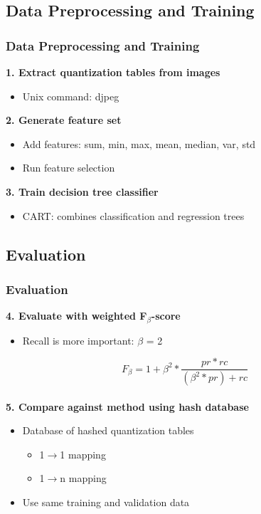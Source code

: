 \documentclass[10pt]{beamer}
\begin{document}
\subsection{Data Preprocessing and Training}
\begin{frame}
\frametitle{Data Preprocessing and Training}
\textbf{1. Extract quantization tables from images}
\begin{itemize}
\item Unix command: djpeg
\end{itemize}
\textbf{2. Generate feature set}
\begin{itemize}
\item Add features: sum, min, max, mean, median, var, std
\item Run feature selection
\end{itemize}
\textbf{3. Train decision tree classifier}
\begin{itemize}
\item CART: combines classification and regression trees
\end{itemize}
\end{frame}


\subsection{Evaluation}
\begin{frame}
\frametitle{Evaluation}
\textbf{4. Evaluate with weighted F$_\beta$-score}
\begin{itemize}
\item Recall is more important: $\beta$ = 2
\end{itemize}
\begin{equation}
F_\beta = 1 + \beta^{2} * \frac{pr * rc}{(\beta^{2} *pr) + rc}
\end{equation}
~\\
\textbf{5. Compare against method using hash database}
\begin{itemize}
\item Database of hashed quantization tables
\begin{itemize}
\item 1$\rightarrow$1 mapping
\item 1$\rightarrow$n mapping
\end{itemize}
\item Use same training and validation data
\end{itemize}
\end{frame}
\end{document}
